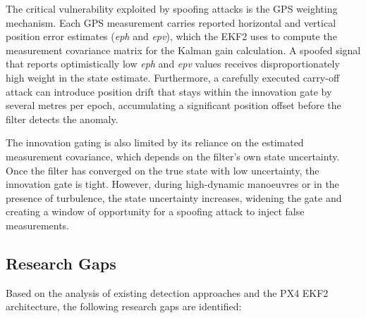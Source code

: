 \documentclass[electronics,article,accept,moreauthors]{Definitions/mdpi}
\begin{document}
The critical vulnerability exploited by spoofing attacks is the GPS weighting mechanism. Each GPS measurement carries reported horizontal and vertical position error estimates ({\it eph} and {\it epv}), which the EKF2 uses to compute the measurement covariance matrix for the Kalman gain calculation. A spoofed signal that reports optimistically low {\it eph} and {\it epv} values receives disproportionately high weight in the state estimate. Furthermore, a carefully executed carry-off attack can introduce position drift that stays within the innovation gate by several metres per epoch, accumulating a significant position offset before the filter detects the anomaly.

The innovation gating is also limited by its reliance on the estimated measurement covariance, which depends on the filter's own state uncertainty. Once the filter has converged on the true state with low uncertainty, the innovation gate is tight. However, during high-dynamic manoeuvres or in the presence of turbulence, the state uncertainty increases, widening the gate and creating a window of opportunity for a spoofing attack to inject false measurements.

\subsection{Research Gaps}
\label{sec:researchgaps}

Based on the analysis of existing detection approaches and the PX4 EKF2 architecture, the following research gaps are identified:
\end{document}

